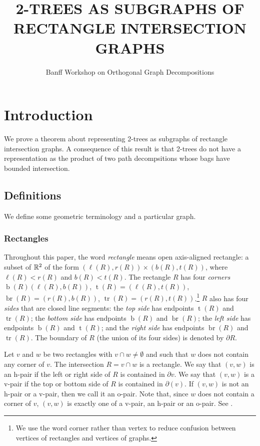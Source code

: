 \documentclass[lotsofwhite]{patmorin}
\title{\MakeUppercase{2-Trees as Subgraphs of Rectangle Intersection Graphs}}
\author{Banff Workshop on Orthogonal Graph Decompositions}
\DeclareMathOperator{\tl}{t}
\DeclareMathOperator{\bl}{b}
\DeclareMathOperator{\tr}{tr}
\DeclareMathOperator{\br}{br}
\begin{document}
\maketitle

\section{Introduction}

We prove a theorem about representing 2-trees as subgraphs of rectangle
intersection graphs.  A consequence of this result is that 2-trees do
not have a representation as the product of two path decompsitions whose
bags have bounded intersection.

\subsection{Definitions}

We define some geometric terminology and a particular graph.

\subsubsection{Rectangles}

Throughout this paper, the word \emph{rectangle} means open axis-aligned
rectangle: a subset of $\mathbb{R}^2$ of the form $(\ell(R),r(R))\times
(b(R),t(R))$, where $\ell(R)< r(R)$ and $b(R)<t(R)$.  The rectangle $R$
has four \emph{corners} $\bl(R)(\ell(R),b(R))$, $\tl(R)=(\ell(R),t(R))$,
$\br(R)=(r(R),b(R))$, $\tr(R)=(r(R),t(R))$.\footnote{We use the word
corner rather than vertex to reduce confusion between vertices of
rectangles and vertices of graphs.}  $R$ also has four \emph{sides}
that are closed line segments: the \emph{top side} has endpoints
$\tl(R)$ and $\tr(R)$; the \emph{bottom side} has endpoints $\bl(R)$
and $\br(R)$; the \emph{left side} has endpoints $\bl(R)$ and $\tl(R)$;
and the \emph{right side} has endpoints $\br(R)$ and $\tr(R)$. The
boundary of $R$ (the union of its four sides) is denoted by $\partial R$.

Let $v$ and $w$ be two rectangles with $v\cap w\neq \emptyset$ and such
that $w$ does not contain any corner of $v$.  The intersection $R=v\cap w$
is a rectangle.  We say that $(v,w)$ is an h-pair if the left or right
side of $R$ is contained in $\partial v$.  We say that $(v,w)$ is a
v-pair if the top or bottom side of $R$ is contained in $\partial(v)$.
If $(v,w)$ is not an h-pair or a v-pair, then we call it an o-pair.
Note that, since $w$ does not contain a corner of $v$, $(v,w)$ is exactly
one of a v-pair, an h-pair or an o-pair. See .
\end{document}
